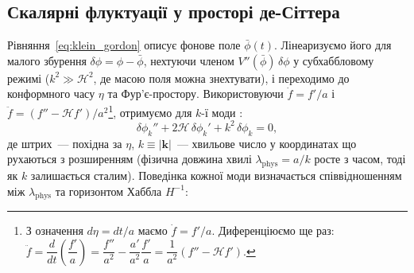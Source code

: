 \documentclass[12pt, a4paper]{article}
\begin{document}
\subsection{Скалярні флуктуації у просторі де-Сіттера}

Рівняння~\eqref{eq:klein_gordon} описує фонове поле $\bar{\phi}(t)$.
Лінеаризуємо його для малого збурення $\delta\phi = \phi - \bar{\phi}$,
нехтуючи членом $V''(\bar{\phi})\,\delta\phi$ у субхаббловому режимі
($k^2 \gg \mathcal{H}^2$, де масою поля можна знехтувати), і переходимо
до конформного часу $\eta$ та Фур'є-простору. Використовуючи
$\dot{f} = f'/a$ і $\ddot{f} = (f'' - \mathcal{H}f')/a^2$\footnote{%
З означення $d\eta = dt/a$ маємо $\dot{f} = f'/a$.
Диференціюємо ще раз:
$\ddot{f} = \dfrac{d}{dt}\!\left(\dfrac{f'}{a}\right)
= \dfrac{f''}{a^2} - \dfrac{a'}{a^2}\dfrac{f'}{a}
= \dfrac{1}{a^2}(f'' - \mathcal{H}f')$.},
отримуємо для $k$-ї моди \cite{mukhanov_2005}:
\begin{equation}\label{eq:fourier_field}
  \delta\phi_k'' + 2\mathcal{H}\,\delta\phi_k'
  + k^2\,\delta\phi_k = 0,
\end{equation}
де штрих~--- похідна за $\eta$, $k \equiv |\mathbf{k}|$~---
хвильове число у координатах що рухаються з розширенням
(фізична довжина хвилі $\lambda_\mathrm{phys} = a/k$ росте з часом,
тоді як $k$ залишається сталим). Поведінка кожної моди визначається
співвідношенням між $\lambda_\mathrm{phys}$ та горизонтом Хаббла $H^{-1}$:
\end{document}
